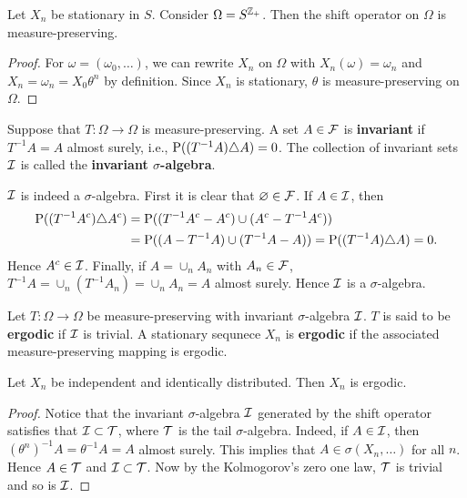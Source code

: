 \begin{proposition}\label{prop:measure_preserving_exist}
    Let $X_n$ be stationary in $S$. Consider $\Omega = S^{\Z_+}$. 
    Then the shift operator on $\Omega$ is measure-preserving.  
\end{proposition}
\begin{proof}
    For $\omega = (\omega_0,\ldots)$, we can rewrite $X_n$ on $\Omega$ 
    with $X_n(\omega) = \omega_n$ and $X_n = \omega_{n} = X_0\theta^n$ by 
    definition. Since $X_n$ is stationary, $\theta$ is measure-preserving 
    on $\Omega$. 
\end{proof}

\begin{definition}
    Suppose that $T:\Omega\to\Omega$ is measure-preserving. A set $A\in\F$ 
    is \textbf{invariant} if $T^{-1}A = A$ almost surely, i.e., 
    $\P((T^{-1}A)\triangle A) = 0$. The collection of invariant 
    sets $\I$ is called the \textbf{invariant $\sigma$-algebra}. 
\end{definition}
\begin{remark}
    $\I$ is indeed a $\sigma$-algebra. First it is clear that $\varnothing\in\F$. 
    If $A\in\I$, then 
    \begin{equation*}
        \begin{split}
            \P((T^{-1}A^c)\triangle A^c) &= \P((T^{-1}A^c - A^c)\cup (A^c - T^{-1}A^c)) \\
            &= \P((A-T^{-1}A)\cup (T^{-1}A - A)) = \P((T^{-1}A)\triangle A) = 0. 
        \end{split}
    \end{equation*} 
    Hence $A^c\in\I$. Finally, if $A = \cup_n A_n$ with $A_n\in\F$, 
    $T^{-1}A = \cup_n(T^{-1}A_n) = \cup_nA_n = A$ almost surely. 
    Hence $\I$ is a $\sigma$-algebra. 
\end{remark}

\begin{definition}
    Let $T:\Omega\to\Omega$ be measure-preserving with invariant $\sigma$-algebra 
    $\I$. $T$ is said to be \textbf{ergodic} if $\I$ is trivial. A 
    stationary sequnece $X_n$ is \textbf{ergodic} if the associated 
    measure-preserving mapping is ergodic.
\end{definition}

\begin{proposition}
    Let $X_n$ be independent and identically distributed. Then $X_n$ 
    is ergodic. 
\end{proposition}
\begin{proof}
    Notice that the invariant $\sigma$-algebra $\I$ generated by the shift 
    operator satisfies that $\I\subset\T$, where $\T$ is the tail 
    $\sigma$-algebra. Indeed, if $A\in\I$, then $(\theta^n)^{-1}A = \theta^{-1}A = A$ 
    almost surely. This implies that $A\in\sigma(X_n,\ldots)$ for all $n$. 
    Hence $A\in\T$ and $\I\subset\T$. Now by the Kolmogorov's zero 
    one law, $\T$ is trivial and so is $\I$. 
\end{proof}

